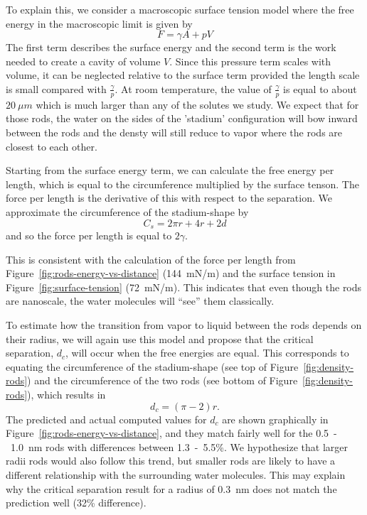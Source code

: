 \documentclass[letterpaper,twocolumn,amsmath,amssymb,prb]{revtex4-1}
\begin{document}
To explain this, we consider a macroscopic surface
tension model where the free energy in the macroscopic limit is given by 
\begin{equation}
F = \gamma A + pV
\end{equation}
The first term describes the surface energy and the second term
is the work needed to create a cavity of volume $V$. Since this pressure term
scales with volume, it can be neglected relative to the surface term provided
the length scale is small compared with $\frac{\gamma} p$. At room temperature,
the value of $\frac{\gamma} p$ is equal to about $20~\mu m$ which is
much larger than any of the solutes we study. We expect that for those 
rods, the water on the sides of the 'stadium' configuration will bow inward 
between the rods and the densty will still reduce to vapor where the rods 
are closest to each other.

Starting from the surface energy term, we can calculate the 
free energy per 
length, which is equal to the circumference multiplied by the surface tenson. 
The force
per length is the derivative of this with respect to the separation. 
We approximate the circumference of the stadium-shape by
\begin{equation}
C_{s} = 2\pi r +4r+2d
\end{equation}
and so the force per length is equal to $2\gamma$.

This is consistent with the calculation of the force per length from 
Figure~\ref{fig:rods-energy-vs-distance} (144~mN/m) and the surface tension 
in Figure~\ref{fig:surface-tension} (72~mN/m). This indicates that
even though the rods are nanoscale, the water molecules will ``see'' them classically.

To estimate how the transition from vapor to liquid between the rods depends on their 
radius, we will again use this model and propose that 
the critical separation, $d_c$, will occur when the free energies are equal. This 
corresponds to equating the circumference of the stadium-shape (see 
top of Figure~\ref{fig:density-rods}) and the circumference of the two rods (see bottom
of Figure~\ref{fig:density-rods}), which results in
\begin{equation}
d_c = (\pi-2)r.\label{criticalseparation}
\end{equation}
The predicted and actual computed values for $d_c$ are shown graphically in 
Figure~\ref{fig:rods-energy-vs-distance}, and they match fairly well for the 
0.5~-~1.0~nm rods with differences between 1.3~-~5.5\%. We hypothesize that larger radii rods
would also follow this trend, but smaller rods are likely to have a different
relationship with the surrounding water molecules. This may explain why the critical
separation result for a radius of 0.3~nm does not match the prediction
well (32\% difference).
\end{document}
